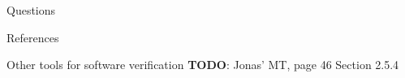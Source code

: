 \documentclass{beamer}
\begin{document}
\begin{frame}
    \begin{center}
        \huge
        Questions
    \end{center}
\end{frame}


\appendix

\begin{frame}[allowframebreaks]{References}
    \nocite{*}
    
    
\end{frame}

\begin{frame}{Other tools for software verification}
    \textbf{TODO}: Jonas' MT, page 46 Section 2.5.4
\end{frame}
\end{document}
